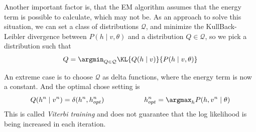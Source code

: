 Another important factor is, that the EM algorithm assumes that the energy term is possible to calculate, which may not be. As an approach to solve this situation, we can set a class of distributions \(\mathcal{Q}\), and minimize the KullBack-Leibler divergence between \(P(h \mid v, \theta)\) and a distribution \(Q \in \mathcal{Q}\), so we pick a distribution such that
\[
  Q = \argmin_{Q \in \mathcal{Q}} \KL{Q(h \mid v)}{P(h\mid v, \theta)}
\]

An extreme case is to choose \(\mathcal{Q}\) as delta functions, where the energy term is now a constant. And the optimal chose setting is
\[
Q(h^{n} \mid v^{n}) = \delta (h^{n}, h^{n}_{opt}) \hspace{2cm} h^{n}_{opt} = \argmax_{h}P(h , v^{n} \mid \theta)
\]
This is called \emph{Viterbi training} and does not guarantee that the log likelihood is being increased in each iteration.
